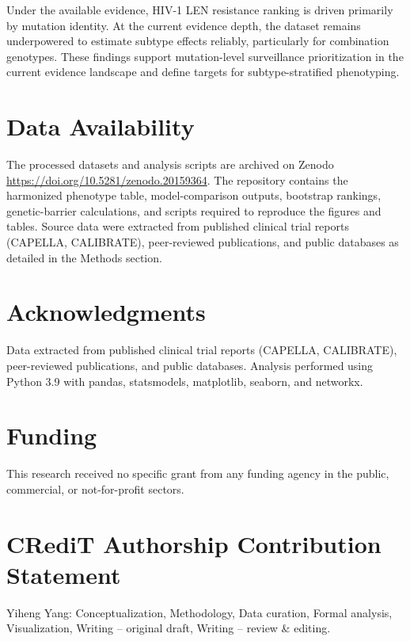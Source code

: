 \documentclass[12pt,a4paper]{article}
\begin{document}
Under the available evidence, HIV-1 LEN resistance ranking is driven primarily by mutation identity. At the current evidence depth, the dataset remains underpowered to estimate subtype effects reliably, particularly for combination genotypes. These findings support mutation-level surveillance prioritization in the current evidence landscape and define targets for subtype-stratified phenotyping.

\section*{Data Availability}
The processed datasets and analysis scripts are archived on Zenodo \url{https://doi.org/10.5281/zenodo.20159364}. The repository contains the harmonized phenotype table, model-comparison outputs, bootstrap rankings, genetic-barrier calculations, and scripts required to reproduce the figures and tables. Source data were extracted from published clinical trial reports (CAPELLA, CALIBRATE), peer-reviewed publications, and public databases as detailed in the Methods section.

\section*{Acknowledgments}
Data extracted from published clinical trial reports (CAPELLA, CALIBRATE), peer-reviewed publications, and public databases. Analysis performed using Python 3.9 with pandas, statsmodels, matplotlib, seaborn, and networkx.

\section*{Funding}
This research received no specific grant from any funding agency in the public, commercial, or not-for-profit sectors.

\section*{CRediT Authorship Contribution Statement}
Yiheng Yang: Conceptualization, Methodology, Data curation, Formal analysis, Visualization, Writing -- original draft, Writing -- review \& editing.
\end{document}
